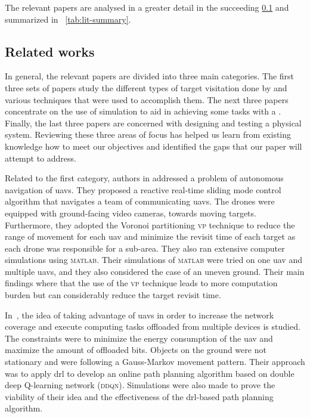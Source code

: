 \documentclass[../main.tex]{subfiles}
\begin{document}

The relevant papers are analysed in a greater detail in
the succeeding \cref{sec:related-work} 
and summarized in ~\ref{tab:lit-summary}.



\subsection{Related works}\label{sec:related-work}

In general, the relevant papers are divided into three main
categories. The first three sets of papers study
the different types of target visitation done by \uavs
and various techniques that were used to accomplish them. 
The next three papers concentrate on the use of simulation
to aid in achieving some tasks with a \uav.
Finally, the last three papers are concerned with designing
and testing a physical \uav system.
Reviewing these three areas of focus has helped us learn
from existing knowledge how to meet our objectives
and identified the gaps that our paper will attempt to 
address.

Related to the first category, authors in \cite{hua20} 
addressed a problem of autonomous navigation of \glspl{uav}. 
They proposed a reactive real-time sliding mode control algorithm 
that navigates a team of communicating \glspl{uav}.
The drones were equipped with ground-facing video cameras,
towards moving targets. 
Furthermore, they adopted the Voronoi partitioning \textsc{vp} technique 
to reduce the range of movement for each \gls{uav} and 
minimize the revisit time of each target as each drone was responsible 
for a sub-area.
They also ran extensive computer simulations using \textsc{matlab}. 
Their simulations of \textsc{matlab} were tried on one \gls{uav} and multiple \glspl{uav},
and they also considered the case of an uneven ground. 
Their main findings where that the use of the \textsc{vp} technique 
leads to more computation burden but can considerably reduce the target 
revisit time.


In~\cite{pen21}, the idea 
of taking advantage of \glspl{uav} in order to increase the network
coverage and execute computing tasks offloaded from multiple devices is studied. 
The constraints were to minimize the energy consumption of the \gls{uav} 
and maximize the amount of offloaded bits. 
Objects on the ground were not stationary and were following a Gauss-Markov 
movement pattern. Their approach was to apply \gls{drl} to develop an online path planning algorithm based on double deep Q-learning network (\textsc{ddqn}).
Simulations were also made to prove the viability of their idea and the 
effectiveness of the \gls{drl}-based path planning algorithm.
\end{document}
